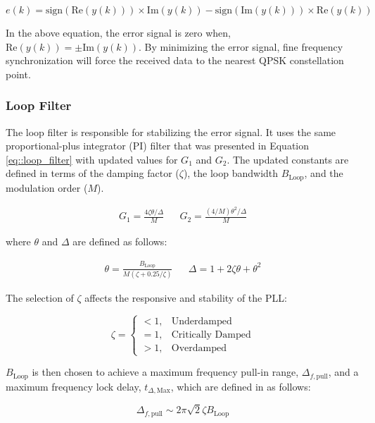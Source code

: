 \documentclass[conference,onecolumn]{IEEEtran}
\begin{document}
\begin{equation}
	e(k) = \text{sign}(\text{Re}(y(k))) \times \text{Im}(y(k)) - \text{sign}(\text{Im}(y(k))) \times \text{Re}(y(k))
\end{equation}

\noindent In the above equation, the error signal is zero when, $\text{Re}(y(k)) = \pm\text{Im}(y(k))$. By minimizing the error signal, fine frequency synchronization will force the received data to the nearest QPSK constellation point.

\subsubsection{Loop Filter}

The loop filter is responsible for stabilizing the error signal. It uses the same proportional-plus integrator (PI) filter that was presented in Equation \ref{eq::loop_filter} with updated values for $G_1$ and $G_2$. The updated constants are defined in terms of the damping factor ($\zeta$), the loop bandwidth $B_{\text{Loop}}$, and the modulation order ($M$).

\begin{align}
	G_1 = \frac{4\zeta\theta/\Delta}{M} && G_2 = \frac{(4/M)\theta^2/\Delta}{M}
\end{align}

\noindent where $\theta$ and $\Delta$ are defined as follows:

\begin{align}
	\theta = \frac{B_{\text{Loop}}}{M(\zeta + 0.25/\zeta)} && \Delta = 1 + 2\zeta\theta + \theta^2
\end{align}

\noindent The selection of $\zeta$ affects the responsive and stability of the PLL:

\begin{equation}
\zeta = \begin{cases}
< 1, & \text{Underdamped}\\
= 1, & \text{Critically Damped}\\
> 1, & \text{Overdamped}
\end{cases}
\end{equation}

\noindent $B_\text{Loop}$ is then chosen to achieve a maximum frequency pull-in range, $\Delta_{f,\text{pull}}$, and a maximum frequency lock delay, $t_{\Delta,\text{Max}}$, which are defined in \cite{collins_2018_softwaredefined} as follows:

\begin{equation}
	\label{eq::max_freq_correct}
	\Delta_{f,\text{pull}} \sim 2\pi\sqrt{2}\zeta{B_\text{Loop}}\end{equation}
\end{document}
